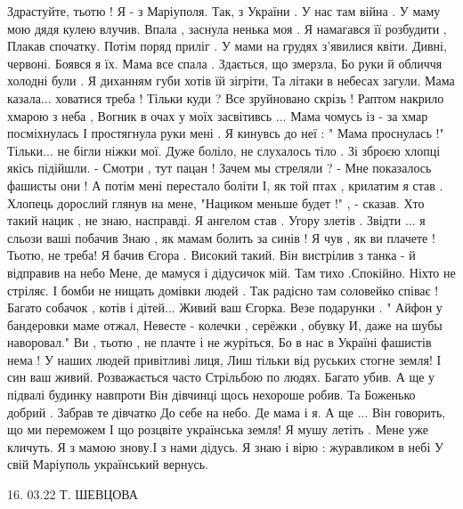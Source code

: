 \raggedcolumns
\begin{multicols}{2} %
\setlength{\parindent}{0pt}
\obeycr
\noindent Здрастуйте, тьотю ! Я - з Маріуполя.
Так, з України . У нас там війна . 
У маму мою дядя кулею влучив.
Впала , заснула  ненька моя .
Я намагався її розбудити , 
Плакав спочатку. Потім поряд приліг .
У мами на грудях з'явилися квіти.
Дивні, червоні. Боявся я їх.
Мама все спала . Здається, що змерзла,
Бо руки й обличчя холодні  були .
Я  диханням губи хотів їй зігріти,
Та літаки в небесах загули.
Мама казала...  ховатися треба !
Тільки куди ? Все зруйновано скрізь !
Раптом накрило хмарою з неба ,
Вогник в очах у моїх засвітивсь ...
Мама чомусь із - за хмар посміхнулась
І простягнула руки мені . 
Я кинувсь до неї : " Мама проснулась !"
Тільки... не бігли ніжки мої. 
Дуже боліло, не слухалось тіло . 
Зі зброєю хлопці якісь підійшли.
- Смотри , тут пацан ! Зачем мы стреляли ?
- Мне показалось  фашисты они ! 
А потім мені перестало боліти
І, як той птах , крилатим я став .
Хлопець дорослий глянув на мене,
"Нациком меньше будет !" , - сказав.
Хто такий нацик , не знаю, насправді.
Я ангелом став . Угору злетів .
Звідти ... я  сльози ваші побачив
Знаю , як мамам болить за синів !
Я чув , як ви плачете ! Тьотю, не треба!
Я бачив Єгора . Високий такий. 
Він вистрілив з танка - й  відправив на  небо 
Мене, де мамуся і дідусичок мій. 
Там тихо .Спокійно. Ніхто не стріляє. 
І бомби не нищать домівки людей . 
Так радісно там соловейко співає !
Багато собачок , котів і дітей...
Живий ваш Єгорка. Везе подарунки . 
" Айфон у бандеровки маме отжал,
Невесте - колечки , серёжки , обувку
И,  даже на шубы  наворовал."
Ви , тьотю , не плачте і  не журіться, 
Бо в нас в Україні фашистів нема !
У наших людей привітливі лиця,
Лиш тільки від руських стогне земля! 
І син ваш живий. Розважається часто
Стрільбою по людях. Багато убив. 
А ще у підвалі  будинку навпроти
Він дівчинці щось нехороше робив. 
Та Боженько добрий . Забрав те дівчатко 
До себе на небо. Де мама і я. 
А ще ... Він говорить, що ми переможем
І що розцвіте українська земля!
Я мушу летіть . Мене уже кличуть. 
Я з мамою знову.І з нами дідусь. 
Я знаю і вірю : журавликом в небі 
У свій  Маріуполь український вернусь. 
\restorecr
\end{multicols} %

16. 03.22                   Т. ШЕВЦОВА
